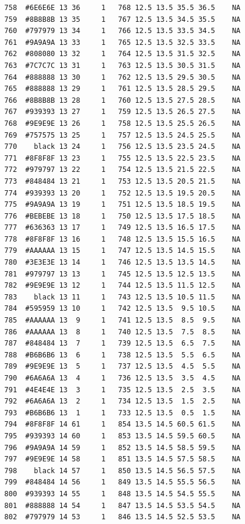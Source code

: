 \documentclass[12pt,twoside]{reedthesis}
\begin{document}
\begin{verbatim}
  758  #6E6E6E 13 36     1   768 12.5 13.5 35.5 36.5    NA
  759  #8B8B8B 13 35     1   767 12.5 13.5 34.5 35.5    NA
  760  #797979 13 34     1   766 12.5 13.5 33.5 34.5    NA
  761  #9A9A9A 13 33     1   765 12.5 13.5 32.5 33.5    NA
  762  #808080 13 32     1   764 12.5 13.5 31.5 32.5    NA
  763  #7C7C7C 13 31     1   763 12.5 13.5 30.5 31.5    NA
  764  #888888 13 30     1   762 12.5 13.5 29.5 30.5    NA
  765  #888888 13 29     1   761 12.5 13.5 28.5 29.5    NA
  766  #8B8B8B 13 28     1   760 12.5 13.5 27.5 28.5    NA
  767  #939393 13 27     1   759 12.5 13.5 26.5 27.5    NA
  768  #9E9E9E 13 26     1   758 12.5 13.5 25.5 26.5    NA
  769  #757575 13 25     1   757 12.5 13.5 24.5 25.5    NA
  770    black 13 24     1   756 12.5 13.5 23.5 24.5    NA
  771  #8F8F8F 13 23     1   755 12.5 13.5 22.5 23.5    NA
  772  #979797 13 22     1   754 12.5 13.5 21.5 22.5    NA
  773  #848484 13 21     1   753 12.5 13.5 20.5 21.5    NA
  774  #939393 13 20     1   752 12.5 13.5 19.5 20.5    NA
  775  #9A9A9A 13 19     1   751 12.5 13.5 18.5 19.5    NA
  776  #BEBEBE 13 18     1   750 12.5 13.5 17.5 18.5    NA
  777  #636363 13 17     1   749 12.5 13.5 16.5 17.5    NA
  778  #8F8F8F 13 16     1   748 12.5 13.5 15.5 16.5    NA
  779  #AAAAAA 13 15     1   747 12.5 13.5 14.5 15.5    NA
  780  #3E3E3E 13 14     1   746 12.5 13.5 13.5 14.5    NA
  781  #979797 13 13     1   745 12.5 13.5 12.5 13.5    NA
  782  #9E9E9E 13 12     1   744 12.5 13.5 11.5 12.5    NA
  783    black 13 11     1   743 12.5 13.5 10.5 11.5    NA
  784  #595959 13 10     1   742 12.5 13.5  9.5 10.5    NA
  785  #AAAAAA 13  9     1   741 12.5 13.5  8.5  9.5    NA
  786  #AAAAAA 13  8     1   740 12.5 13.5  7.5  8.5    NA
  787  #848484 13  7     1   739 12.5 13.5  6.5  7.5    NA
  788  #B6B6B6 13  6     1   738 12.5 13.5  5.5  6.5    NA
  789  #9E9E9E 13  5     1   737 12.5 13.5  4.5  5.5    NA
  790  #6A6A6A 13  4     1   736 12.5 13.5  3.5  4.5    NA
  791  #4E4E4E 13  3     1   735 12.5 13.5  2.5  3.5    NA
  792  #6A6A6A 13  2     1   734 12.5 13.5  1.5  2.5    NA
  793  #B6B6B6 13  1     1   733 12.5 13.5  0.5  1.5    NA
  794  #8F8F8F 14 61     1   854 13.5 14.5 60.5 61.5    NA
  795  #939393 14 60     1   853 13.5 14.5 59.5 60.5    NA
  796  #9A9A9A 14 59     1   852 13.5 14.5 58.5 59.5    NA
  797  #9E9E9E 14 58     1   851 13.5 14.5 57.5 58.5    NA
  798    black 14 57     1   850 13.5 14.5 56.5 57.5    NA
  799  #848484 14 56     1   849 13.5 14.5 55.5 56.5    NA
  800  #939393 14 55     1   848 13.5 14.5 54.5 55.5    NA
  801  #888888 14 54     1   847 13.5 14.5 53.5 54.5    NA
  802  #797979 14 53     1   846 13.5 14.5 52.5 53.5    NA

\end{verbatim}
\end{document}

